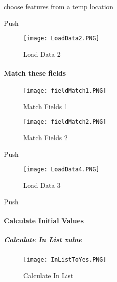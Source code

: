   {\bigbtn choose features from a temp location}

 \vspace{.2in}

  {\bigbtn Push }


  \begin{figure}[h!]
  \centering
      \texttt{[image: LoadData2.PNG]}
  \caption{Load Data 2}
  \end{figure}

 \clearpage

  \paragraph[Match these fields]{\Large Match these fields}

  \begin{figure}[h!]
  \centering
      \texttt{[image: fieldMatch1.PNG]}
  \vspace{-.2in}

  \caption{Match Fields 1}
  \end{figure}
  \begin{figure}[h!]
  \centering
      \texttt{[image: fieldMatch2.PNG]}
  \vspace{-.2in}

  \caption{Match Fields 2}
  \end{figure}
  \clearpage
 {\bigbtn Push }
  \begin{figure}[h!]
  \centering
      \texttt{[image: LoadData4.PNG]}
  \caption{Load Data 3}
  \end{figure}

 {\bigbtn Push }

  \clearpage


 \paragraph{Calculate Initial Values}


 \subparagraph{Calculate In List value}

 \begin{figure}[h!]
  \centering
      \texttt{[image: InListToYes.PNG]}
  \caption{Calculate In List}
  \end{figure}

